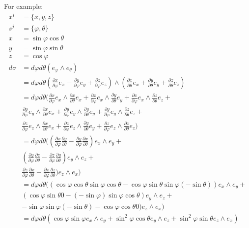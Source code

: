 \documentclass[11pt,letterpaper,fleqn]{memoir}
\begin{document}
\begin{remark}
	For example:
	\begin{align*}
		x^i &= \{x,y,z\} \\
		s^j &= \{\varphi, \theta\} \\
		x &= \sin \varphi \cos \theta \\ 
		y &= \sin \varphi \sin \theta \\ 
		z &= \cos \varphi \\ 
		d\sigma &= d\varphi d\theta (e_\varphi \wedge e_\theta) \\
		&=d\varphi d\theta \left(\frac{\partial x}{\partial \varphi} e_x + \frac{\partial y}{\partial \varphi} e_y + \frac{\partial z}{\partial \varphi} e_z\right) \wedge \left(\frac{\partial x}{\partial \theta} e_x + \frac{\partial y}{\partial \theta} e_y + \frac{\partial z}{\partial \theta} e_z\right) \\
		&=d\varphi d\theta (
\frac{\partial x}{\partial \varphi} e_x \wedge \frac{\partial x}{\partial \theta} e_x +
\frac{\partial x}{\partial \varphi} e_x \wedge \frac{\partial y}{\partial \theta} e_y +
\frac{\partial x}{\partial \varphi} e_x \wedge \frac{\partial z}{\partial \theta} e_z + \\
&\frac{\partial y}{\partial \varphi} e_y \wedge \frac{\partial x}{\partial \theta} e_x +
\frac{\partial y}{\partial \varphi} e_y \wedge \frac{\partial y}{\partial \theta} e_y +
\frac{\partial y}{\partial \varphi} e_y \wedge \frac{\partial z}{\partial \theta} e_z + \\
&\frac{\partial z}{\partial \varphi} e_z \wedge \frac{\partial x}{\partial \theta} e_x +
\frac{\partial z}{\partial \varphi} e_z \wedge \frac{\partial y}{\partial \theta} e_y + 
\frac{\partial z}{\partial \varphi} e_z \wedge \frac{\partial z}{\partial \theta} e_z ) \\
		&=d\varphi d\theta ((
\frac{\partial x}{\partial \varphi} \frac{\partial y}{\partial \theta} - \frac{\partial y}{\partial \varphi}\frac{\partial x}{\partial \theta}) e_x \wedge e_y + \\
& (\frac{\partial y}{\partial \varphi} \frac{\partial z}{\partial \theta} - \frac{\partial z}{\partial \varphi} \frac{\partial y}{\partial \theta}) e_y \wedge e_z + \\
&\frac{\partial z}{\partial \varphi} \frac{\partial x}{\partial \theta} - \frac{\partial x}{\partial \varphi} \frac{\partial z}{\partial \theta}) e_z \wedge e_x ) \\
		&=d\varphi d\theta ((
\cos \varphi \cos \theta \sin \varphi \cos \theta - \cos \varphi \sin \theta \sin \varphi (-\sin \theta)) e_x \wedge e_y + \\
& (\cos \varphi \sin \theta  0 - (- \sin \varphi) \sin \varphi \cos \theta) e_y \wedge e_z + \\
& - \sin \varphi \sin \varphi (-\sin \theta) - \cos \varphi \cos \theta 0) e_z \wedge e_x ) \\
		&=d\varphi d\theta (\cos \varphi \sin \varphi e_x \wedge e_y +
\sin^2 \varphi \cos \theta e_y \wedge e_z +
\sin^2 \varphi \sin \theta e_z \wedge e_x )
	\end{align*}
\end{remark}
\end{document}
